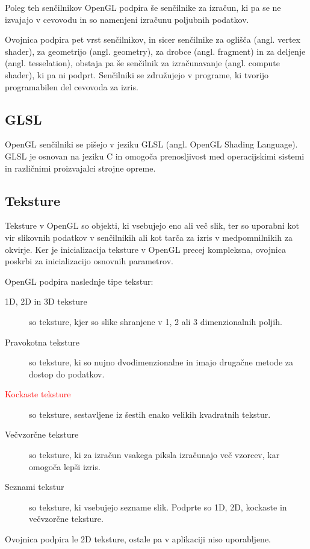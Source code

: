 \documentclass[a4paper, 12pt]{book}
\begin{document}
Poleg teh senčilnikov OpenGL podpira še senčilnike za izračun, ki pa se ne izvajajo v cevovodu in so namenjeni izračunu poljubnih podatkov.

Ovojnica podpira pet vrst senčilnikov, in sicer senčilnike za oglišča (angl. vertex shader), za geometrijo (angl. geometry), za drobce (angl. fragment) in za deljenje (angl. tesselation), obstaja pa še senčilnik za izračunavanje (angl. compute shader), ki pa ni podprt. Senčilniki se združujejo v programe, ki tvorijo programabilen del cevovoda za izris.

\subsection*{GLSL}

OpenGL senčilniki se pišejo v jeziku GLSL\cite{GLSL} (angl. OpenGL Shading Language). GLSL je osnovan na jeziku C in omogoča prenosljivost med operacijskimi sistemi in različnimi proizvajalci strojne opreme.

\subsection*{Teksture}

Teksture v OpenGL so objekti, ki vsebujejo eno ali več slik, ter so uporabni kot vir slikovnih podatkov v senčilnikih ali kot tarča za izris v medpomnilnikih za okvirje. Ker je inicializacija teksture v OpenGL precej kompleksna, ovojnica poskrbi za inicializacijo osnovnih parametrov.

OpenGL podpira naslednje tipe tekstur:

\begin{description}
\item [1D, 2D in 3D teksture]so teksture, kjer so slike shranjene v 1, 2 ali 3 dimenzionalnih poljih.
\item [Pravokotna teksture]so teksture, ki so nujno dvodimenzionalne in imajo drugačne metode za dostop do podatkov.
\item [\textcolor{red}{Kockaste teksture}]so teksture, sestavljene iz šestih enako velikih kvadratnih tekstur.
\item [Večvzorčne teksture]so teksture, ki za izračun vsakega piksla izračunajo več vzorcev, kar omogoča lepši izris.
\item [Seznami tekstur]so teksture, ki vsebujejo sezname slik. Podprte so 1D, 2D, kockaste in večvzorčne teksture.
\end{description}

Ovojnica podpira le 2D teksture, ostale pa v aplikaciji niso uporabljene.
\end{document}
